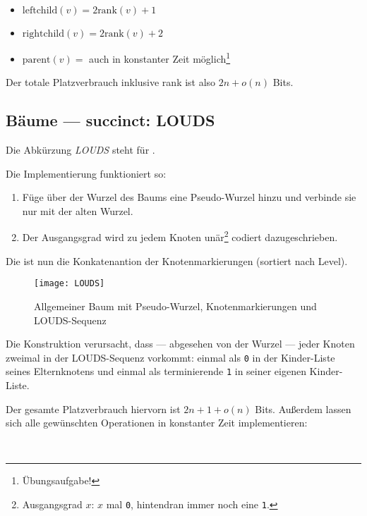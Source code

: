 \begin{itemize}
  \item \( \text{leftchild}(v) = 2\text{rank}(v) + 1 \)
  \item \( \text{rightchild}(v) = 2\text{rank}(v) + 2 \)
  \item \( \text{parent}(v) =  \) auch in konstanter Zeit möglich\footnote{Übungsaufgabe!}
\end{itemize}

Der totale Platzverbrauch inklusive rank ist also \( 2n + o(n) \) Bits.


\subsection{Bäume --- succinct: LOUDS}

Die Abkürzung \emph{LOUDS} steht für .

Die Implementierung funktioniert so:

\begin{enumerate}
  \item Füge über der Wurzel des Baums eine Pseudo-Wurzel hinzu und verbinde sie nur mit der alten Wurzel.
  \item Der Ausgangsgrad wird zu jedem Knoten unär\footnote{Ausgangsgrad \( x \): \( x \) mal \texttt{0}, hintendran immer noch eine \texttt{1}.} codiert dazugeschrieben.
\end{enumerate}

Die  ist nun die Konkatenantion der Knotenmarkierungen (sortiert nach Level).

\begin{figure}[H]
  \texttt{[image: LOUDS]}
  \caption{Allgemeiner Baum mit Pseudo-Wurzel, Knotenmarkierungen und LOUDS-Sequenz}
\end{figure}

Die Konstruktion verursacht, dass --- abgesehen von der Wurzel --- jeder Knoten zweimal in der LOUDS-Sequenz vorkommt: einmal als \texttt{0} in der Kinder-Liste seines Elternknotens und einmal als terminierende \texttt{1} in seiner eigenen Kinder-Liste.

Der gesamte Platzverbrauch hiervorn ist \( 2n + 1 + o(n) \) Bits. Außerdem lassen sich alle gewünschten Operationen in konstanter Zeit implementieren:

\ \\ 

